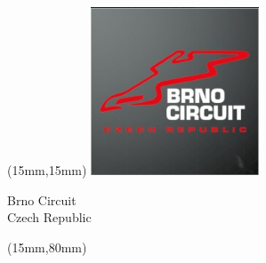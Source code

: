 \begin{textblock*}{50mm}(15mm,15mm)%
\includegraphics[width=50mm]{LG/2015-05-20_00075.png}
\par Brno Circuit\\ Czech Republic
\end{textblock*}
\begin{textblock*}{185mm}(15mm,80mm)%
\end{textblock*}

